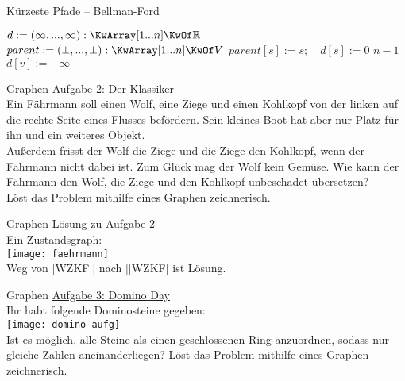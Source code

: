 \begin{frame}{Kürzeste Pfade – Bellman-Ford}
	\begin{exampleblock}{}
		\begin{algorithm}[H]
			\small
			 {
				$d := (\infty, ..., \infty) : \KwArray[1...n] \KwOf \R$\;
				$parent := (\bot, ..., \bot) : \KwArray[1...n] \KwOf V$\;
				$parent[s] := s ; \quad d[s] := 0$ \;
				 $n-1$  
				 {
					 {
						$d[v] := -\infty$\;
					}
				}
				\;
			}
		\end{algorithm}
	\end{exampleblock}
\end{frame}



\begin{frame}{Graphen}
	\underline{Aufgabe 2: Der Klassiker} \\
	Ein Fährmann soll einen Wolf, eine Ziege und einen Kohlkopf von der linken auf die rechte Seite eines Flusses befördern. Sein kleines Boot hat aber nur Platz für ihn und ein weiteres Objekt. \\
	Außerdem frisst der Wolf die Ziege und die Ziege den Kohlkopf, wenn der Fährmann nicht dabei ist. Zum Glück mag der Wolf kein Gemüse. Wie kann der Fährmann den Wolf, die Ziege und den Kohlkopf unbeschadet übersetzen? \\
	Löst das Problem mithilfe eines Graphen zeichnerisch.
\end{frame}

\begin{frame}{Graphen}
	\underline{Lösung zu Aufgabe 2} \\
	Ein Zustandsgraph: \\
	\texttt{[image: faehrmann]} \\
	Weg von [WZKF|] nach [|WZKF] ist Lösung.
\end{frame}

\begin{frame}{Graphen}
	\underline{Aufgabe 3: Domino Day} \\
	Ihr habt folgende Dominosteine gegeben: \\
	\texttt{[image: domino-aufg]} \\
	Ist es möglich, alle Steine als einen geschlossenen Ring anzuordnen, sodass nur gleiche Zahlen aneinanderliegen? Löst das Problem mithilfe eines Graphen zeichnerisch.
\end{frame}

